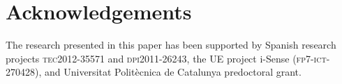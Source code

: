 \documentclass[
  review,
  twocolumn,
  5p,
  sort&compress,
]{elsarticle}
\begin{document}












\section*{Acknowledgements}

The research presented in this paper has been supported by Spanish
research projects \textsc{tec2012-35571} and \textsc{dpi2011-26243},
the UE project i-Sense (\textsc{fp7-ict-270428}), and Universitat
Polit\`{e}cnica de Catalunya predoctoral grant.






\appendix
%
\end{document}
